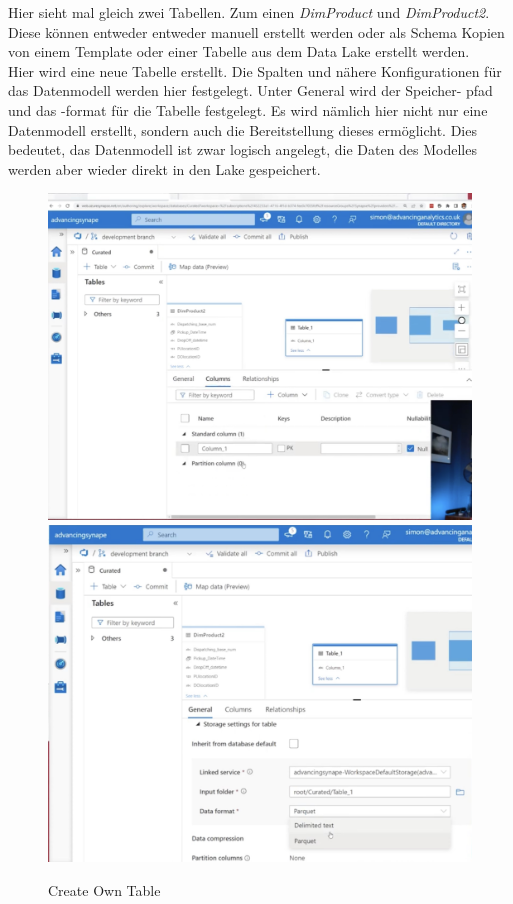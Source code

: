 Hier sieht mal gleich zwei Tabellen. Zum einen \textit{DimProduct} und \textit{DimProduct2}. Diese können entweder entweder manuell erstellt werden oder als Schema Kopien von einem Template oder einer Tabelle aus dem Data Lake erstellt werden.\\

Hier wird eine neue Tabelle erstellt. Die Spalten und nähere Konfigurationen für das Datenmodell werden hier festgelegt. Unter General wird der Speicher- pfad und das -format für die Tabelle festgelegt. Es wird nämlich hier nicht nur eine Datenmodell erstellt, sondern auch die Bereitstellung dieses ermöglicht. Dies bedeutet, das Datenmodell ist zwar logisch angelegt, die Daten des Modelles werden aber wieder direkt in den Lake gespeichert.

\begin{figure}[H]
	\centering
	\includegraphics[scale = 0.2]{attachment/chapter_2/Scc141}
		\includegraphics[scale = 0.2]{attachment/chapter_2/Scc143}
	\caption{Create Own Table}
\end{figure}

